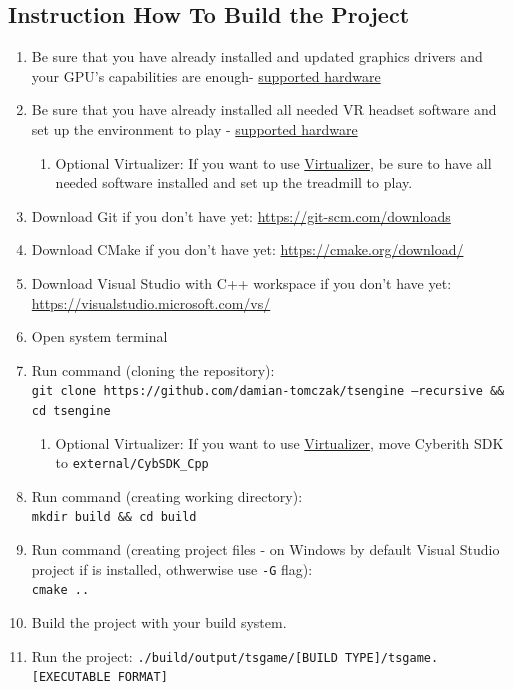 \subsection{Instruction How To Build the Project}
\label{sec:how_to_run}
\begin{enumerate}
    \item Be sure that you have already installed and updated graphics drivers and your GPU's capabilities are enough- \hyperref[sec:hardware]{supported hardware}
    \item Be sure that you have already installed all needed VR headset software and set up the environment to play - \hyperref[sec:hardware]{supported hardware}
    \begin{enumerate}
        \item Optional Virtualizer: If you want to use \hyperref[sec:virtualizer]{Virtualizer}, be sure to have all needed software installed and set up the treadmill to play.
    \end{enumerate}
    \item Download Git if you don't have yet:
        \href{https://git-scm.com/downloads}{https://git-scm.com/downloads}
    \item Download CMake if you don't have yet:
        \href{https://cmake.org/download/}{https://cmake.org/download/}
    \item Download Visual Studio with C++ workspace if you don't have yet:
        \href{https://visualstudio.microsoft.com/vs/}{https://visualstudio.microsoft.com/vs/}
    \item Open system terminal
    \item Run command (cloning the repository):\\
        \texttt{git clone https://github.com/damian-tomczak/tsengine --recursive \&\& cd tsengine}
    \begin{enumerate}
        \item Optional Virtualizer: If you want to use \hyperref[sec:virtualizer]{Virtualizer}, move Cyberith SDK to \texttt{external/CybSDK\_Cpp}
    \end{enumerate}
    \item Run command (creating working directory):\\
        \texttt{mkdir build \&\& cd build}
    \item Run command (creating project files - on Windows by default Visual Studio project if is installed, othwerwise use \texttt{-G} flag):\\
        \texttt{cmake ..}
    \item Build the project with your build system.
    \item Run the project: \texttt{./build/output/tsgame/[BUILD TYPE]/tsgame.[EXECUTABLE FORMAT]}
\end{enumerate}

